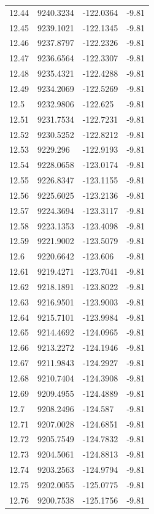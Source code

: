 \begin{table}[H]
\begin{tabular}{llll}
12.44 & 9240.3234 & -122.0364 & -9.81 \\
12.45 & 9239.1021 & -122.1345 & -9.81 \\
12.46 & 9237.8797 & -122.2326 & -9.81 \\
12.47 & 9236.6564 & -122.3307 & -9.81 \\
12.48 & 9235.4321 & -122.4288 & -9.81 \\
12.49 & 9234.2069 & -122.5269 & -9.81 \\
12.5 & 9232.9806 & -122.625 & -9.81 \\
12.51 & 9231.7534 & -122.7231 & -9.81 \\
12.52 & 9230.5252 & -122.8212 & -9.81 \\
12.53 & 9229.296 & -122.9193 & -9.81 \\
12.54 & 9228.0658 & -123.0174 & -9.81 \\
12.55 & 9226.8347 & -123.1155 & -9.81 \\
12.56 & 9225.6025 & -123.2136 & -9.81 \\
12.57 & 9224.3694 & -123.3117 & -9.81 \\
12.58 & 9223.1353 & -123.4098 & -9.81 \\
12.59 & 9221.9002 & -123.5079 & -9.81 \\
12.6 & 9220.6642 & -123.606 & -9.81 \\
12.61 & 9219.4271 & -123.7041 & -9.81 \\
12.62 & 9218.1891 & -123.8022 & -9.81 \\
12.63 & 9216.9501 & -123.9003 & -9.81 \\
12.64 & 9215.7101 & -123.9984 & -9.81 \\
12.65 & 9214.4692 & -124.0965 & -9.81 \\
12.66 & 9213.2272 & -124.1946 & -9.81 \\
12.67 & 9211.9843 & -124.2927 & -9.81 \\
12.68 & 9210.7404 & -124.3908 & -9.81 \\
12.69 & 9209.4955 & -124.4889 & -9.81 \\
12.7 & 9208.2496 & -124.587 & -9.81 \\
12.71 & 9207.0028 & -124.6851 & -9.81 \\
12.72 & 9205.7549 & -124.7832 & -9.81 \\
12.73 & 9204.5061 & -124.8813 & -9.81 \\
12.74 & 9203.2563 & -124.9794 & -9.81 \\
12.75 & 9202.0055 & -125.0775 & -9.81 \\
12.76 & 9200.7538 & -125.1756 & -9.81 \\

\end{tabular}
\end{table}
